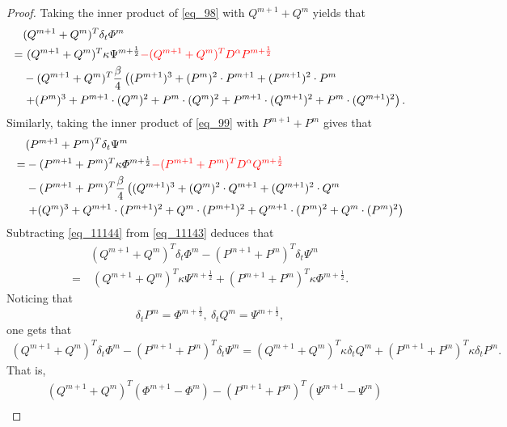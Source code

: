 \documentclass[preprint,compress,3p,10pt,fleqn]{elsarticle}
\numberwithin{equation}{section}
\begin{document}
\begin{proof}
Taking the inner product of \eqref{eq_98} with $Q^{m+1}+Q^{m}$ yields that
\begin{align}
&(Q^{m+1}+Q^{m})^{T}\delta_{t} \varPhi^{m}\nonumber\\
=&~(Q^{m+1}+Q^{m})^{T}\kappa \Psi^{m+\frac{1}{2}}\textcolor[rgb]{1.00,0.00,0.00}{-(Q^{m+1}+Q^{m})^{T}D^{\alpha} P^{m+\frac{1}{2}}}\nonumber\\
&-(Q^{m+1}+Q^{m})^{T}\frac{\beta}{4}\left((P^{m+1})^3+(P^{m})^{2}\cdot P^{m+1}+(P^{m+1})^{2}\cdot P^{m}\right.\nonumber\\
&\left.+(P^{m})^{3}+P^{m+1}\cdot (Q^{m})^{2}+P^{m}\cdot (Q^{m})^{2}+P^{m+1}\cdot (Q^{m+1})^{2}+P^{m}\cdot (Q^{m+1})^{2}\right).\label{eq_11143}
\end{align}
Similarly, taking the inner product of \eqref{eq_99} with $P^{m+1}+P^{m}$ gives that
\begin{align}
&(P^{m+1}+P^{m})^{T}\delta_{t} \Psi^{m}\nonumber\\
=&-(P^{m+1}+P^{m})^{T}\kappa \varPhi^{m+\frac{1}{2}}\textcolor[rgb]{1.00,0.00,0.00}{-(P^{m+1}+P^{m})^{T}D^{\alpha} Q^{m+\frac{1}{2}}}\nonumber\\
&-(P^{m+1}+P^{m})^{T}\frac{\beta}{4}\left((Q^{m+1})^3+(Q^{m})^{2}\cdot Q^{m+1}+(Q^{m+1})^{2}\cdot Q^{m}\right.\nonumber\\
&\left.+(Q^{m})^{3}+Q^{m+1}\cdot (P^{m+1})^{2}+Q^{m}\cdot (P^{m+1})^{2}+Q^{m+1}\cdot (P^{m})^{2}+Q^{m}\cdot (P^{m})^{2}\right)\label{eq_11144}
\end{align}
Subtracting \eqref{eq_11144} from \eqref{eq_11143} deduces that
\begin{align}
&(Q^{m+1}+Q^{m})^{T}\delta_{t} \varPhi^{m}-(P^{m+1}+P^{m})^{T}\delta_{t} \Psi^{m}\nonumber\\
=&~(Q^{m+1}+Q^{m})^{T}\kappa \Psi^{m+\frac{1}{2}}+(P^{m+1}+P^{m})^{T}\kappa \varPhi^{m+\frac{1}{2}}.\label{eq_11145}
\end{align}
Noticing that
$$\delta_t P^m=\varPhi^{m+\frac{1}{2}},~\delta_t Q^m=\Psi^{m+\frac{1}{2}},$$
one gets that
\begin{align}\label{eq_11146}
(Q^{m+1}+Q^{m})^{T}\delta_{t} \varPhi^{m}\!-\!(P^{m+1}+P^{m})^{T}\delta_{t} \Psi^{m}=(Q^{m+1}+Q^{m})^{T}\kappa \delta_t Q^m+(P^{m+1}+P^{m})^{T}\kappa \delta_t P^m.
\end{align}
That is,
\begin{align}
&(Q^{m+1}+Q^{m})^{T}(\varPhi^{m+1}-\varPhi^{m})-(P^{m+1}+P^{m})^{T}(\Psi^{m+1}-\Psi^{m})\nonumber\\

\end{align}
\end{proof}
\end{document}

